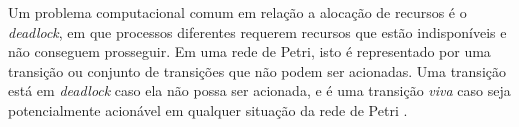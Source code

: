 Um problema computacional comum em relação a alocação de recursos é o \textit{deadlock}, em que processos diferentes requerem recursos que estão indisponíveis e não conseguem prosseguir. Em uma rede de Petri, isto é representado por uma transição ou conjunto de transições que não podem ser acionadas. Uma transição está em \textit{deadlock} caso ela não possa ser acionada, e é uma transição \textit{viva} caso seja potencialmente acionável em qualquer situação da rede de Petri \cite{peterson:1981}.

